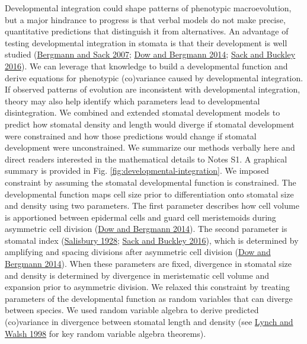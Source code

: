 \documentclass[
  12pt,
]{article}
\begin{document}
Developmental integration could shape patterns of phenotypic macroevolution, but a major hindrance to progress is that verbal models do not make precise, quantitative predictions that distinguish it from alternatives. An advantage of testing developmental integration in stomata is that their development is well studied (\protect\hyperlink{ref-bergmann_stomatal_2007}{Bergmann and Sack 2007}; \protect\hyperlink{ref-dow_patterning_2014}{Dow and Bergmann 2014}; \protect\hyperlink{ref-sack_developmental_2016}{Sack and Buckley 2016}). We can leverage that knowledge to build a developmental function and derive equations for phenotypic (co)variance caused by developmental integration. If observed patterns of evolution are inconsistent with developmental integration, theory may also help identify which parameters lead to developmental disintegration. We combined and extended stomatal development models to predict how stomatal density and length would diverge if stomatal development were constrained and how those predictions would change if stomatal development were unconstrained. We summarize our methods verbally here and direct readers interested in the mathematical details to Notes S1. A graphical summary is provided in Fig. \ref{fig:developmental-integration}. We imposed constraint by assuming the stomatal developmental function is constrained. The developmental function maps cell size prior to differentiation onto stomatal size and density using two parameters. The first parameter describes how cell volume is apportioned between epidermal cells and guard cell meristemoids during asymmetric cell division (\protect\hyperlink{ref-dow_patterning_2014}{Dow and Bergmann 2014}). The second parameter is stomatal index (\protect\hyperlink{ref-salisbury_i_1928}{Salisbury 1928}; \protect\hyperlink{ref-sack_developmental_2016}{Sack and Buckley 2016}), which is determined by amplifying and spacing divisions after asymmetric cell division (\protect\hyperlink{ref-dow_patterning_2014}{Dow and Bergmann 2014}). When these parameters are fixed, divergence in stomatal size and density is determined by divergence in meristematic cell volume and expansion prior to asymmetric division. We relaxed this constraint by treating parameters of the developmental function as random variables that can diverge between species. We used random variable algebra to derive predicted (co)variance in divergence between stomatal length and density (see \protect\hyperlink{ref-lynch_genetics_1998}{Lynch and Walsh 1998} for key random variable algebra theorems).
\end{document}
